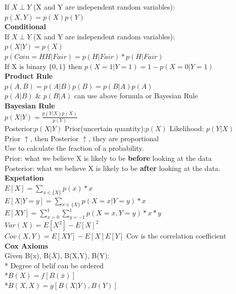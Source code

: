 \documentclass[12pt,a4paper]{extarticle}
\begin{document}
\newline
If $X \perp Y$ (X and Y are independent random variables):\\$p(X,Y)=p(X)p(Y)$\\
\newline
\textbf{Conditional}\\
If $X \perp Y$ (X and Y are independent random variables):\\$p(X|Y)=p(X)$\\
$p(Coin = HH|Fair) = p(H|Fair)*p(H|Fair)$\\
If X is binary $\{0,1\}$ then $p(X=1|Y=1)= 1-p(X=0|Y=1)$\\
\newline
\textbf{Product Rule}\\
$p(A,B)=p(A|B)p(B)=p(B|A)p(A)$\\
$p(A|B)$ \& $p(B|A)$ can use above formula or Bayesian Rule\\
\newline
\textbf{Bayesian Rule}\\
$p(X|Y)=\frac{p(Y|X)p(X)}{p(Y)}$\\
Posterior:$p(X|Y)$ \quad Prior(uncertain quantity):$p(X)$ \quad Likelihood: $p(Y|X)$ \\
Prior $\uparrow$, then Posterior $\uparrow$, they are proportional\\
Use to calculate the fraction of a probability.\\
Prior: what we believe X is likely to be \textbf{before} looking at the data\\
Posterior: what we believe X is likely to be \textbf{after} looking at the data.\\
\newline 
\textbf{Expetation}\\
$E[X] = \sum_{x\in \{X\}} p(x)*x$\\
$E[X|Y=y]=\sum_{x\in \{X\}} p(X=x|Y=y)*x$\\
$E[XY]=\sum_{x=0}^1 \sum_{y=-1}^1 p(X=x,Y=y)*x*y$\\
$Var(X)= E[X^2]-E[X]^2$\\
$Cov(X,Y)=E[XY]-E[X]E[Y]$ Cov is the correlation coefficient\\
\textbf{Cox Axioms}\\
Given B(x), B($\bar{X}$), B(X,Y), B(Y):\\
* Degree of belif can be ordered\\
*$B(X)=f[B(\bar{x})]$\\
*$B(X,X)=g[B(X|Y),B(Y)]$\\
\end{document}
